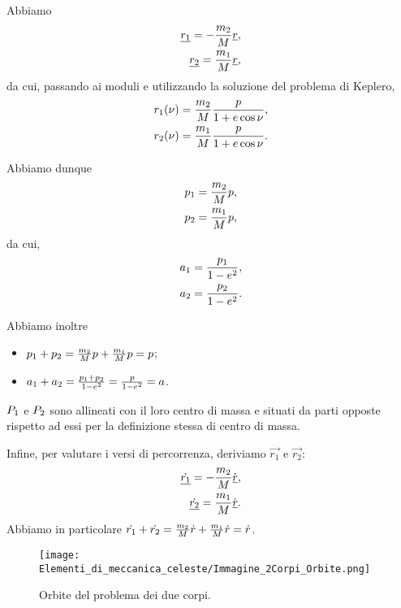 \Proof Abbiamo
\begin{align*}
	\underline{r_1} = - \frac{m_2}{M} \underline{r},\\
	\underline{r_2} = \frac{m_1}{M} \underline{r},
\end{align*}
da cui, passando ai moduli e utilizzando la soluzione del problema di Keplero,
\begin{align*}
	r_1(\nu) = \frac{m_2}{M} \frac{p}{1 + e \cos{\nu}},\\
	r_2(\nu) = \frac{m_1}{M} \frac{p}{1 + e \cos{\nu}}.
\end{align*}
\par Abbiamo dunque
\begin{align*}
	p_1 = \frac{m_2}{M} p,\\
	p_2 = \frac{m_1}{M} p,
\end{align*}
da cui,
\begin{align*}
	a_1 = \frac{p_1}{1 - e^2},\\
	a_2 = \frac{p_2}{1 - e^2}.
\end{align*}
\par Abbiamo inoltre
\begin{itemize}
	\item $p_1 + p_2 = \frac{m_2}{M} p + \frac{m_1}{M} p = p$;
	\item $a_1 + a_2 = \frac{p_1 + p_2}{1 - e^2} = \frac{p}{1 -e^2} = a$.
\end{itemize}
\par $P_1$ e $P_2$ sono allineati con il loro centro di massa e situati da parti opposte rispetto ad essi per la definizione stessa di centro di massa.
\par Infine, per valutare i versi di percorrenza, deriviamo $\vec{r_1}$ e $\vec{r_2}$:
\begin{align*}
	\dot{\underline{r_1}} = - \frac{m_2}{M} \dot{\underline{r}},\\
	\dot{\underline{r_2}} = \frac{m_1}{M} \dot{\underline{r}}.
\end{align*}
Abbiamo in particolare $\dot{r_1} + \dot{r_2} = \frac{m_2}{M} \dot{r} + \frac{m_1}{M} \dot{r} = \dot{r}$. \EndProof
\begin{figure}
	\texttt{[image: Elementi\_di\_meccanica\_celeste/Immagine\_2Corpi\_Orbite.png]}
	\centering
	\caption{Orbite del problema dei due corpi.}
\end{figure}
